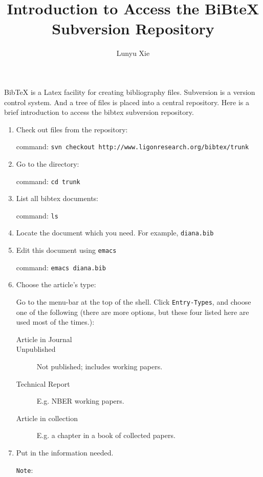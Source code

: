 \documentclass{article}
\begin{document}
\title{Introduction to Access the BiBteX Subversion Repository}
\author{Lunyu Xie}
\maketitle

BibTeX is a Latex facility for creating bibliography files. Subversion is a version control system. And a tree of files is placed into a central repository. Here is a brief introduction to access the bibtex subversion repository.

\begin{enumerate}
\item{Check out files from the repository:

command: \texttt{svn checkout http://www.ligonresearch.org/bibtex/trunk}}

\item{Go to the directory:

command: \texttt{cd trunk}}


\item{List all bibtex documents:

command: \texttt{ls}}


\item{Locate the document which you need. For example, \texttt{diana.bib}}


\item{Edit this document using \texttt{emacs}

command: \texttt{emacs diana.bib}}


\item{Choose the article's type:

    Go to the menu-bar at the top of the shell. Click
    \texttt{Entry-Types}, and choose one of the following (there are more options, but these four listed here are used most of the times.):
    \begin{description}
    \item[Article in Journal]
    \item[Unpublished]{Not published; includes working papers.}
    \item[Technical Report]{E.g. NBER working papers.}
    \item[Article in collection]{E.g. a chapter in a book of collected papers.}
    \end{description}}

\item{Put in the information needed.

\texttt{Note}: 

}
\end{enumerate}
\end{document}
